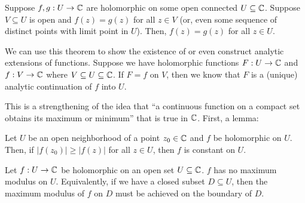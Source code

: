 \begin{corollary}
  Suppose $f, g : U \to \mathbb C$ are holomorphic on some open connected $U \subseteq \mathbb C$. Suppose $V \subseteq U$ is open and $f(z) = g(z)$ for all $z \in V$ (or, even some sequence of distinct points with limit point in $U$). Then, $f(z) = g(z)$ for all $z \in U$.
\end{corollary}
We can use this theorem to show the existence of or even construct analytic extensions of functions. Suppose we have holomorphic functions $F : U \to \mathbb C$ and $f : V \to \mathbb C$ where $V \subseteq U \subseteq \mathbb C$. If $F = f$ on $V$, then we know that $F$ is a (unique) analytic continuation of $f$ into $U$.

This is a strengthening of the idea that ``a continuous function on a compact set obtains its maximum or minimum'' that is true in $\mathbb C$. First, a lemma:
\begin{lemma}
  Let $U$ be an open neighborhood of a point $z_0 \in \mathbb C$ and $f$ be holomorphic on $U$. Then, if $|f(z_0)| \geq |f(z)|$ for all $z \in U$, then $f$ is constant on $U$.
\end{lemma}

\begin{theorem}
  Let $f : U \to \mathbb C$ be holomorphic on an open set $U \subseteq \mathbb C$. $f$ has no maximum modulus on $U$. Equivalently, if we have a closed subset $D \subseteq U$, then the maximum modulus of $f$ on $D$ must be achieved on the boundary of $D$.
\end{theorem}



